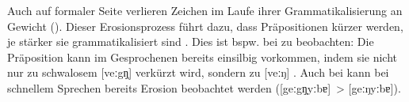 Auch auf formaler Seite verlieren Zeichen im Laufe ihrer Grammatikalisierung an Gewicht (\cites[s.][16]{Heine.1991}[134]{Lehmann.1995}). 
Dieser Erosionsprozess führt dazu, dass Präpositionen kürzer werden, je stärker sie grammatikalisiert sind \citep[s.][66--67]{Diewald.1997}.
Dies ist bspw. bei  zu beobachten: Die Präposition kann im Gesprochenen bereits einsilbig vorkommen, indem sie nicht nur zu schwalosem [veːgŋ̩] verkürzt wird, sondern zu [veːŋ] \citep[s.][9]{Lindqvist1994}. 
Auch bei \gegenueber{} kann bei schnellem Sprechen bereits Erosion beobachtet werden ([geːgŋ̩yːbɐ]~> [geːŋyːbɐ]).

